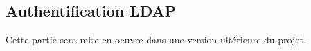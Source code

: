 \subsection{Authentification LDAP}

\begin{tip}
    \textcolor{Chartreuse4}{Cette partie sera mise en oeuvre dans une version ultérieure du projet.}
\end{tip}
